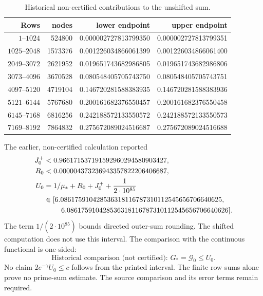 \begin{table}[ht]
\centering\small
\caption{Historical non-certified contributions to the unshifted sum.}
\label{tab:app-g24-rows}
\begin{tabular}{@{}rrrr@{}}
\hline
Rows & nodes & lower endpoint & upper endpoint\\
\hline
\(1\)--\(1024\)&524800&0.000002727813799350&0.000002727813799351\\
\(1025\)--\(2048\)&1573376&0.001226034866061399&0.001226034866061400\\
\(2049\)--\(3072\)&2621952&0.019651743682986805&0.019651743682986806\\
\(3073\)--\(4096\)&3670528&0.080548405705743750&0.080548405705743751\\
\(4097\)--\(5120\)&4719104&0.146720281588383935&0.146720281588383936\\
\(5121\)--\(6144\)&5767680&0.200161682376550457&0.200161682376550458\\
\(6145\)--\(7168\)&6816256&0.242188572133550572&0.242188572133550573\\
\(7169\)--\(8192\)&7864832&0.275672089024516687&0.275672089024516688\\
\hline
\end{tabular}
\end{table}

The earlier, non-certified calculation reported
\begin{equation}\label{eq:app-g24-numbers}
\begin{aligned}
 J_0^+&<0.966171537191592960294580903427,\\
 R_0&<0.000004373236943357822206406687,\\
 U_0&=1/\mu_*+R_0+J_0^++\frac1{2\cdot10^{85}}\\
 &\in[6.086175910428536318116787310112545656706640625,\\
 &\hspace{2.4em}6.086175910428536318116787310112545656706640626].
\end{aligned}
\end{equation}
The term \(1/(2\cdot10^{85})\) bounds directed outer-sum rounding.
The shifted computation does not use this interval.
The comparison with the continuous functional is one-sided:
\begin{equation}\label{eq:app-g24-inclusion}
 \text{Historical comparison (not certified): }G_* = \mathcal G_0\le U_0.
\end{equation}
No claim $2e^{-\gamma}U_0\le c$ follows from the printed interval.
The finite row sums alone prove no prime-sum estimate.
The source comparison and its error terms remain required.

